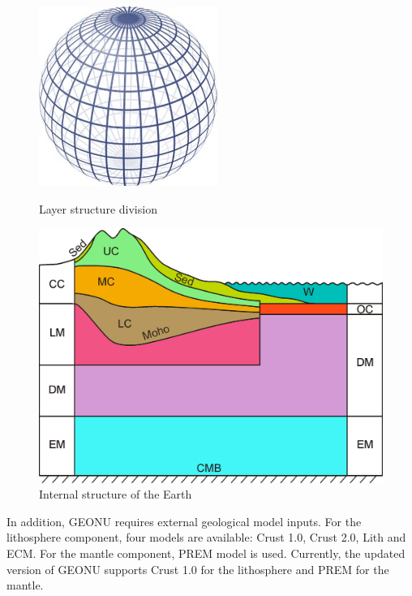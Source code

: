 				\begin{figure}[H]
					\centering
					\begin{minipage}{0.49\linewidth}
						\centering
						\includegraphics[width=0.6\linewidth]{./Pics/Earth_Structure_1.jpg}
						\caption{Layer structure division}
						\label{Fig:Earth Structure 1}
					\end{minipage}
					\begin{minipage}{0.49\linewidth}
						\center
						\includegraphics[width=0.8\linewidth]{./Pics/Earth_Structure_2.jpg}
						\caption{Internal structure of the Earth \cite{huang2013reference}}
						\label{Fig:Earth Structure 2}
					\end{minipage}
				\end{figure}
			In addition, GEONU requires external geological model inputs. For the lithosphere component, four models are available: Crust 1.0, Crust 2.0, Lith and ECM. For the mantle component, PREM model is used. Currently, the updated version of GEONU supports Crust 1.0 for the lithosphere and PREM for the mantle.\par
